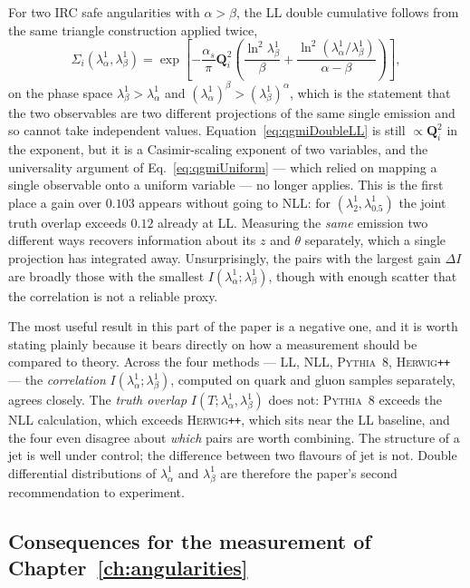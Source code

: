 For two IRC safe angularities with \(\alpha>\beta\), the LL double cumulative follows
from the same triangle construction applied twice,
\begin{equation}
	\Sigma_i(\lambda^1_\alpha,\lambda^1_\beta) = \exp\left[-\frac{\alpha_s}{\pi}
	\mathbf{Q}_i^2\left(\frac{\ln^2\lambda^1_\beta}{\beta}
	+ \frac{\ln^2(\lambda^1_\alpha/\lambda^1_\beta)}{\alpha-\beta}\right)\right] ,
	\label{eq:qgmiDoubleLL}
\end{equation}
on the phase space \(\lambda^1_\beta>\lambda^1_\alpha\) and
\((\lambda^1_\alpha)^\beta>(\lambda^1_\beta)^\alpha\), which is the statement that the
two observables are two different projections of the same single emission and so
cannot take independent values. Equation~\ref{eq:qgmiDoubleLL} is still
\(\propto\mathbf{Q}_i^2\) in the exponent, but it is a Casimir-scaling exponent of two
variables, and the universality argument of Eq.~\ref{eq:qgmiUniform} --- which relied
on mapping a single observable onto a uniform variable --- no longer applies. This is
the first place a gain over \(0.103\) appears without going to NLL: for
\((\lambda^1_2,\lambda^1_{0.5})\) the joint truth overlap exceeds \(0.12\) already at
LL. Measuring the \emph{same} emission two different ways recovers information about
its \(z\) and \(\theta\) separately, which a single projection has integrated away.
Unsurprisingly, the pairs with the largest gain \(\Delta I\) are broadly those with
the smallest \(I(\lambda^1_\alpha;\lambda^1_\beta)\), though with enough scatter that
the correlation is not a reliable proxy.

The most useful result in this part of the paper is a negative one, and it is worth
stating plainly because it bears directly on how a measurement should be compared to
theory. Across the four methods --- LL, NLL, \textsc{Pythia}~8, \textsc{Herwig}\texttt{++} --- the
\emph{correlation} \(I(\lambda^1_\alpha;\lambda^1_\beta)\), computed on quark and
gluon samples separately, agrees closely. The \emph{truth overlap}
\(I(T;\lambda^1_\alpha,\lambda^1_\beta)\) does not: \textsc{Pythia}~8 exceeds the NLL
calculation, which exceeds \textsc{Herwig}\texttt{++}, which sits near the LL baseline, and the four
even disagree about \emph{which} pairs are worth combining. The structure of a jet is
well under control; the difference between two flavours of jet is not. Double
differential distributions of \(\lambda^1_\alpha\) and \(\lambda^1_\beta\) are
therefore the paper's second recommendation to experiment.

\subsection{Consequences for the measurement of Chapter~\ref{ch:angularities}}
\label{subsec:qgmiThesis}

